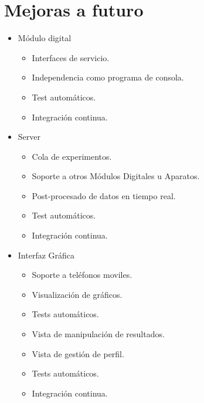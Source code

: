 \section{Mejoras a futuro}

\begin{itemize}

\item M\'odulo digital
    \begin{itemize}
    \item Interfaces de servicio.
    \item Independencia como programa de consola.
    \item Test autom\'aticos.
    \item Integraci\'on continua.
    \end{itemize}
\item Server
    \begin{itemize}
    \item Cola de experimentos.
    \item Soporte a otros M\'odulos Digitales u Aparatos.
    \item Post-procesado de datos en tiempo real.
    \item Test autom\'aticos.
    \item Integraci\'on continua.
    \end{itemize}
\item Interfaz Gr\'afica
    \begin{itemize}
    \item Soporte a tel\'efonos moviles.
    \item Visualizaci\'on de gr\'aficos.
    \item Tests autom\'aticos.
    \item Vista de manipulaci\'on de resultados.
    \item Vista de gesti\'on de perfil.
    \item Tests autom\'aticos.
    \item Integraci\'on continua.
    \end{itemize}
\end{itemize}
\newpage